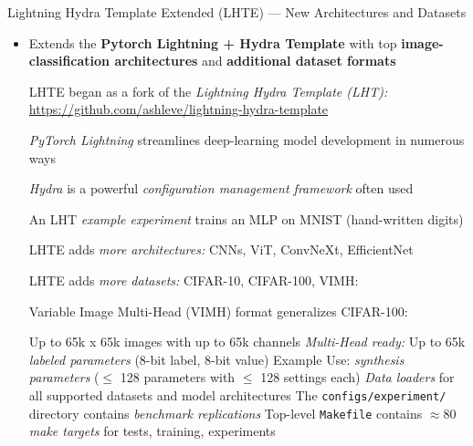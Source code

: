 \begin{slide}[\slideopts,toc={Lightning Hydra Template Ext}]{Lightning Hydra Template Extended (LHTE) --- New Architectures and Datasets}


\vspace{-1em}
  

  \begin{itemize}

    \item Extends the \textbf{Pytorch Lightning + Hydra Template} with top \textbf{image-classification architectures} and \textbf{additional dataset formats}

    \mpitem LHTE began as a fork of the \emph{Lightning Hydra Template (LHT):} \url{https://github.com/ashleve/lightning-hydra-template}
    \begin{itemize}

      \mpitem \emph{PyTorch Lightning} streamlines deep-learning model development in
      numerous ways

      \mpitem \emph{Hydra} is a powerful \emph{configuration management framework} often used

      \mpitem An LHT \emph{example experiment} trains an MLP on MNIST (hand-written digits)

    \end{itemize}

    \mpitem LHTE adds \emph{more architectures:} CNNs,  ViT, ConvNeXt, EfficientNet

    \mpitem LHTE adds \emph{more datasets:} CIFAR-10, CIFAR-100, VIMH:

    \mpitem Variable Image Multi-Head (VIMH) format generalizes CIFAR-100:
    \begin{itemize}
      \mpitem Up to 65k x 65k images with up to 65k channels %
      \mpitem \emph{Multi-Head ready:} Up to 65k \emph{labeled parameters} (8-bit label, 8-bit value)
      \mpitem Example Use: \emph{synthesis parameters} ($\le$ 128 parameters with $\le$ 128 settings each)
      \mpitem \emph{Data loaders} for all supported datasets and model architectures
      \mpitem The \texttt{configs/experiment/} directory contains \emph{benchmark replications} %
      \mpitem Top-level \texttt{Makefile} contains $\approx 80$ \emph{make targets} for tests, training, experiments
    \end{itemize}
  \end{itemize}

\end{slide}

